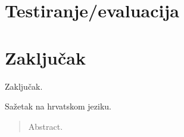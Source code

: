 \documentclass[times, utf8, zavrsni,numeric,pstricks]{fer}
\begin{document}
\chapter{Testiranje/evaluacija}

\chapter{Zaključak}
Zaključak.




\begin{sazetak}
Sažetak na hrvatskom jeziku.

\end{sazetak}



\begin{abstract}
Abstract.

\end{abstract}
\end{document}

